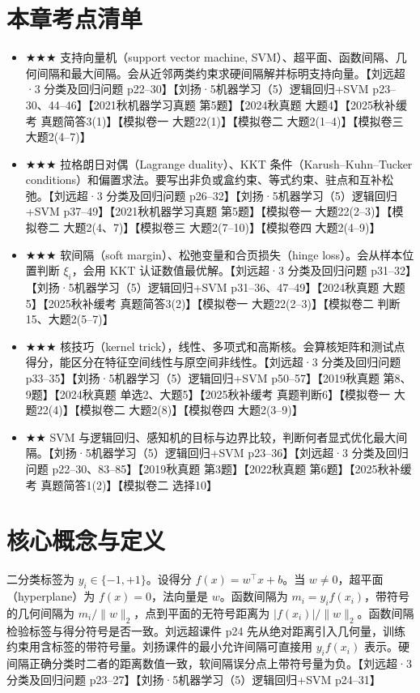 \documentclass[UTF8,a4paper,zihao=-4,fontset=fandol]{ctexrep}
\begin{document}
\section{本章考点清单}
\begin{itemize}
\item \ensuremath{\bigstar\bigstar\bigstar} 支持向量机（support vector machine, SVM）、超平面、函数间隔、几何间隔和最大间隔。会从近邻两类约束求硬间隔解并标明支持向量。【刘远超·3 分类及回归问题 p22–30】【刘扬·5机器学习（5）逻辑回归+SVM p23–30、44–46】【2021秋机器学习真题 第5题】【2024秋真题 大题4】【2025秋补缓考 真题简答3(1)】【模拟卷一 大题22(1)】【模拟卷二 大题2(1–4)】【模拟卷三 大题2(4–7)】
\item \ensuremath{\bigstar\bigstar\bigstar} 拉格朗日对偶（Lagrange duality）、KKT 条件（Karush–Kuhn–Tucker conditions）和偏置求法。要写出非负或盒约束、等式约束、驻点和互补松弛。【刘远超·3 分类及回归问题 p26–32】【刘扬·5机器学习（5）逻辑回归+SVM p37–49】【2021秋机器学习真题 第5题】【模拟卷一 大题22(2–3)】【模拟卷二 大题2(4、7)】【模拟卷三 大题2(7–10)】【模拟卷四 大题2(4–9)】
\item \ensuremath{\bigstar\bigstar\bigstar} 软间隔（soft margin）、松弛变量和合页损失（hinge loss）。会从样本位置判断 $\xi_i$，会用 KKT 认证数值最优解。【刘远超·3 分类及回归问题 p31–32】【刘扬·5机器学习（5）逻辑回归+SVM p31–36、47–49】【2024秋真题 大题5】【2025秋补缓考 真题简答3(2)】【模拟卷一 大题22(2–3)】【模拟卷二 判断15、大题2(5–7)】
\item \ensuremath{\bigstar\bigstar\bigstar} 核技巧（kernel trick），线性、多项式和高斯核。会算核矩阵和测试点得分，能区分在特征空间线性与原空间非线性。【刘远超·3 分类及回归问题 p33–35】【刘扬·5机器学习（5）逻辑回归+SVM p50–57】【2019秋真题 第8、9题】【2024秋真题 单选2、大题5】【2025秋补缓考 真题判断6】【模拟卷一 大题22(4)】【模拟卷二 大题2(8)】【模拟卷四 大题2(3–9)】
\item \ensuremath{\bigstar\bigstar} SVM 与逻辑回归、感知机的目标与边界比较，判断何者显式优化最大间隔。【刘扬·5机器学习（5）逻辑回归+SVM p23–36】【刘远超·3 分类及回归问题 p22–30、83–85】【2019秋真题 第3题】【2022秋真题 第6题】【2025秋补缓考 真题简答1(2)】【模拟卷二 选择10】
\end{itemize}

\section{核心概念与定义}
二分类标签为 $y_i\in\{-1,+1\}$。设得分 $f(x)=w^\top x+b$。当 $w\ne0$，超平面（hyperplane）为 $f(x)=0$，法向量是 $w$。函数间隔为 $m_i=y_i f(x_i)$，带符号的几何间隔为 $m_i/\|w\|_2$，点到平面的无符号距离为 $|f(x_i)|/\|w\|_2$。函数间隔检验标签与得分符号是否一致。刘远超课件 p24 先从绝对距离引入几何量，训练约束用含标签的带符号量。刘扬课件的最小允许间隔可直接用 $y_i f(x_i)$ 表示。硬间隔正确分类时二者的距离数值一致，软间隔误分点上带符号量为负。【刘远超·3 分类及回归问题 p23–27】【刘扬·5机器学习（5）逻辑回归+SVM p24–31】
\end{document}

